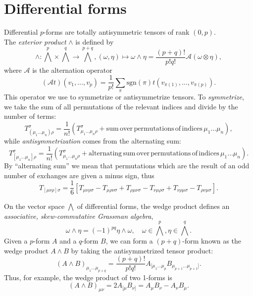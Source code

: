 \section{Differential forms}
Differential $p$-forms are totally antisymmetric tensors of rank $(0,p)$.\\
The \emph{exterior product} $\wedge$ is defined by 
\begin{equation}
\wedge:\bigwedge^p \times \bigwedge^q \rightarrow \bigwedge^{p+q}, (\omega, \eta) \mapsto \omega \wedge \eta = \frac{(p+q)!}{p!q!} \mathcal{A}(\omega\otimes \eta),
\end{equation}
where $\mathcal{A}$ is the alternation operator
\begin{equation}
	(\mathcal{A}t)(v_1,\dots,v_p) = \frac{1}{p!} \sum_{\pi} \mathrm{sgn}(\pi) t(v_{\pi(1)}, \dots, v_{\pi(p)}).
\end{equation}
This operator we use to symmetrize or antisymmetrize tensors. To \emph{symmetrize}, we take the sum of all permutations of the relevant indices
and divide by the number of terms:
\begin{equation}
	T^{\sigma}_{(\mu_1 \dots \mu_n)\rho} = \frac{1}{n!} \left(T^{\sigma}_{\mu_1 \dots \mu_n \rho} + \mathrm{sum\,over\,permutations\,of\,indices\,} \mu_1 \dots \mu_n\right),
\end{equation}
while \emph{antisymmetrization} comes from the alternating sum:
\begin{equation}
T^{\sigma}_{[\mu_1 \dots \mu_n]\rho} = \frac{1}{n!} \left(T^{\sigma}_{\mu_1 \dots \mu_n \rho} + \mathrm{alternating\,sum\,over\,permutations\,of\,indices\,} \mu_1 \dots \mu_n\right).
\end{equation}
By “alternating sum” we mean that permutations which are the result of an odd number of
exchanges are given a minus sign, thus
\begin{equation}
	T_{[\mu \nu \rho] \sigma} = \frac{1}{6} \left[T_{\mu \nu \rho \sigma } - T_{\mu \rho \nu \sigma}  +T_{\rho \mu \nu  \sigma} -T_{\nu \mu \rho  \sigma} +T_{\nu \rho \mu \sigma}-T_{\rho \nu \mu \sigma} \right].
\end{equation}

On the vector space $\bigwedge$ of differential forms, the wedge product defines an \emph{associative, skew-commutative Grassman algebra},
\begin{equation}
	\omega \wedge \eta = (-1)^{pq} \eta \wedge \omega, \quad \omega \in \bigwedge^p, \eta \in \bigwedge^q.
\end{equation}
Given a $p$-form $A$ and a $q$-form $B$, we can form a $(p + q)$-form known as the wedge
product $A \wedge B$ by taking the antisymmetrized tensor product:
\begin{equation}
	(A\wedge B)_{\mu_1 \dots \mu_{p+q}} = \frac{(p+q)!}{p! q!} A_{[\mu_1 \dots \mu_p} B_{\mu_{p+1} \dots \mu_{p+1}]}.
\end{equation}
Thus, for example, the wedge product of two 1-forms is
\begin{equation}
	(A \wedge B)_{\mu \nu} = 2 A_{[\mu} B_{\nu]} = A_{\mu} B_{\nu} - A_{\nu} B_{\mu}.
\end{equation}



